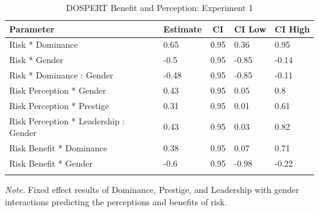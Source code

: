 \documentclass[
  donotrepeattitle,doc, 12pt, a4paper,floatsintext]{apa7}
\begin{document}
\begin{table}[h]

\begin{center}
\begin{threeparttable}

\caption{\label{tab:m5_int_fixef_exp_1}DOSPERT Benefit and Perception: Experiment 1}

\begin{tabular}{lllll}
\toprule
Parameter & \multicolumn{1}{c}{Estimate} & \multicolumn{1}{c}{CI} & \multicolumn{1}{c}{CI Low} & \multicolumn{1}{c}{CI High}\\
\midrule
Risk * Dominance & 0.65 & 0.95 & 0.36 & 0.95\\
Risk * Gender & -0.5 & 0.95 & -0.85 & -0.14\\
Risk * Dominance : Gender & -0.48 & 0.95 & -0.85 & -0.11\\
Risk Perception * Gender & 0.43 & 0.95 & 0.05 & 0.8\\
Risk Perception * Prestige & 0.31 & 0.95 & 0.01 & 0.61\\
Risk Perception * Leadership : Gender & 0.43 & 0.95 & 0.03 & 0.82\\
Risk Benefit * Dominance & 0.38 & 0.95 & 0.07 & 0.71\\
Risk Benefit * Gender & -0.6 & 0.95 & -0.98 & -0.22\\
\bottomrule
\addlinespace
\end{tabular}

\begin{tablenotes}[para]
\normalsize{\textit{Note.} Fixed effect results of Dominance, Prestige, and Leadership with gender interactions predicting the perceptions and benefits of risk.}
\end{tablenotes}

\end{threeparttable}
\end{center}

\end{table}
\end{document}
